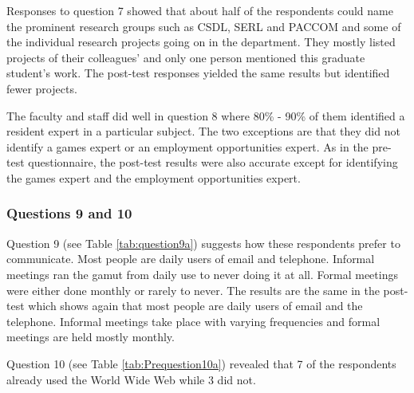 Responses to question 7 showed that about half of the respondents could name
the prominent research groups such as CSDL, SERL and PACCOM and some of the
individual research projects going on in the department.  They mostly listed
projects of their colleagues' and only one person mentioned this graduate
student's work.  The post-test responses yielded the same results but
identified fewer projects.  

The faculty and staff did well in question 8 where 80\% - 90\% of them
identified a resident expert in a particular subject.  The two exceptions are
that they did not identify a games expert or an employment opportunities
expert.  As in the pre-test questionnaire, the post-test results were also
accurate except for identifying the games expert and the employment
opportunities expert.  


\subsubsection{Questions 9 and 10}

Question 9 (see Table \ref{tab:question9a}) suggests how these respondents
prefer to communicate.  Most people are daily users of email and telephone.
Informal meetings ran the gamut from daily use to never doing it at all.
Formal meetings were either done monthly or rarely to never.  The results are
the same in the post-test which shows again that most people are daily users of
email and the telephone.  Informal meetings take place with varying frequencies
and formal meetings are held mostly monthly.

Question 10 (see Table \ref{tab:Prequestion10a}) revealed that 7 of the
respondents already used the World Wide Web while 3 did not.

